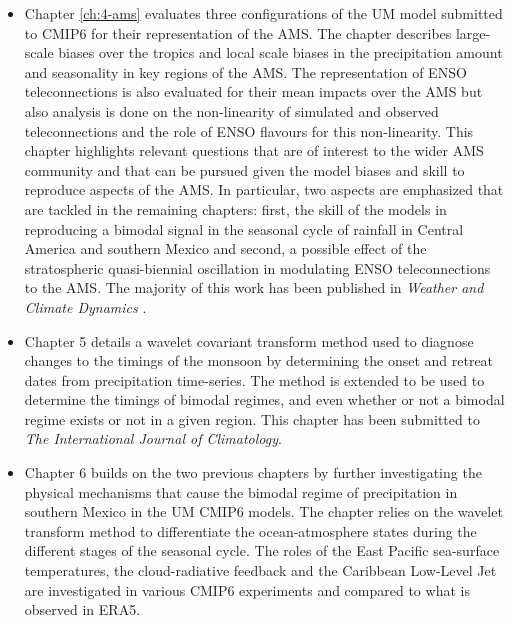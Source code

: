 \begin{itemize}
\item Chapter \ref{ch:4-ams} evaluates three configurations of the UM model submitted to CMIP6 for their representation of the AMS. The chapter describes large-scale biases over the tropics and local scale biases in the precipitation amount and seasonality in key regions of the AMS. 
The representation of ENSO teleconnections is also evaluated for their mean impacts over the AMS but also analysis is done on the non-linearity of simulated and observed teleconnections and the role of ENSO flavours for this non-linearity. This chapter highlights relevant questions that are of interest to the wider AMS community and that can be pursued given the model biases and skill to reproduce aspects of the AMS. In particular, two aspects are emphasized that are tackled in the remaining chapters: first, the skill of the models in reproducing a bimodal signal in the seasonal cycle of rainfall in Central America and southern Mexico and second, a possible effect of the stratospheric quasi-biennial oscillation in modulating ENSO teleconnections to the AMS. 
The majority of this work has been published in \textit{Weather and Climate Dynamics} \cite{garciafranco2020}.
\item Chapter 5 details a wavelet covariant transform method used to diagnose changes to the timings of the monsoon by determining the onset and retreat dates from precipitation time-series. The method is extended to be used to determine the timings of bimodal regimes, and even whether or not a bimodal regime exists or not in a given region. This chapter has been submitted to \textit{The International Journal of Climatology}. 
\item Chapter 6 builds on the two previous chapters by further investigating the physical mechanisms that cause the bimodal regime of precipitation in southern Mexico in the UM CMIP6 models. The chapter relies on the wavelet transform method to differentiate the ocean-atmosphere states during the different stages of the seasonal cycle. The roles of the East Pacific sea-surface temperatures, the cloud-radiative feedback and the Caribbean Low-Level Jet  are investigated in various CMIP6 experiments and compared to what is observed in ERA5. 
\end{itemize}